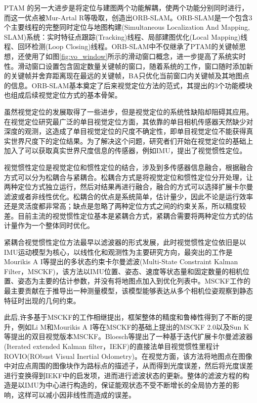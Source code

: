 PTAM 的另一大进步是将定位与建图两个功能解耦，使两个功能分别同时进行，而这一优点被Mur-Artal R等\cite{mur2015orb,mur2017orb}吸取，创造出ORB-SLAM。ORB-SLAM是一个包含3个主要线程的完整同时定位与地图构建(Simultaneous Localization And Mapping, SLAM)系统：实时特征点跟踪(Tracking)线程、局部建图优化(Local Mapping)线程、回环检测(Loop Closing)线程。ORB-SLAM中不仅继承了PTAM的关键帧思想，还使用了如图\ref{fig:vo_window}所示的滑动窗口概念，进一步提高了系统实时性。滑动窗口设置包含固定数量关键帧的窗口，随着系统的工作，窗口随时添加新的关键帧并舍弃距离现在最远的关键帧，BA只优化当前窗口内关键帧及其地图点的信息。ORB-SLAM基本奠定了后来视觉定位方法的范式，其提出的3个功能模块也组成后续视觉定位方式的基本骨架。

虽然视觉定位的发展取得了一些进步，但是视觉定位的系统性缺陷却阻碍其应用。在视觉定位研究最广泛的单目视觉定位方面，其依靠的单目相机传感器天然缺少对深度的观测，这造成了单目视觉定位的尺度不确定性，即单目视觉定位不能获得真实世界尺度下的定位结果。为了解决这个问题，研究者们开始在视觉定位的基础上加入了可以获取真实世界尺度信息的传感器，例如IMU，提出了视觉惯性定位。

视觉惯性定位是视觉定位和惯性定位的结合，涉及到多传感器信息融合，根据融合方式可以分为松耦合\cite{lynen2013robust}与紧耦合\cite{falquez2016inertial}。松耦合方式是将视觉定位和惯性定位分开处理，让两种定位方式独立运行，然后对结果再进行融合，融合的方式可以选择扩展卡尔曼滤波或者非线性优化。松耦合的优点是系统简单，估计量少，因此不论是运行效率还是灵活度都非常高；缺点是忽略了两种定位方式之间的约束关系，所以精度较差。目前主流的视觉惯性定位基本是紧耦合方式，紧耦合需要将两种定位方式的估计量作为一个整体同时优化。

紧耦合视觉惯性定位方法最早以滤波器的形式发展，此时视觉惯性定位依旧是以IMU运动模型为核心，以线性化和观测性为主要研究方向，最突出的工作是Mourikis A I等\cite{mourikis2007multi}提出的多状态约束卡尔曼滤波(Multi-State Constraint Kalman Filter，MSCKF)，该方法以IMU位置、姿态、速度等状态量和固定数量的相机位置、姿态为主要的估计参数，并没有将地图点加入到优化列表中。MSCKF工作的最主要贡献在于推导出一种测量模型，该模型能够表达从多个相机位姿观察到静态特征时出现的几何约束。

此后,许多基于MSCKF的工作相继提出，框架整体的精度和鲁棒性得到了不断的提升，例如Li M和Mourikis A I等\cite{li2013high}在MSCKF的基础上提出的MSCKF 2.0以及Sun K等\cite{sun2018robust}提出的双目视觉版本MSCKF。Bloesch等\cite{bloesch2017iterated}提出了一种基于迭代扩展卡尔曼滤波器(Iterated extended Kalman filter，IEKF)的直接法单目视觉惯性里程计ROVIO(RObust Visual Inertial Odometry)。在视觉方面，该方法将地图点在图像中对应点周围的图像块作为路标点的描述子，从而得到光度误差，然后将光度误差进行变换得到IEKF中的启发项，进而进行滤波状态的更新。整体的滤波方程的构造是以IMU为中心进行构造的，保证能观状态不受不断增长的全局协方差的影响，这样可以减小因非线性而造成的误差。

